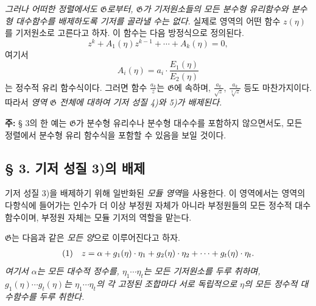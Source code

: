 \emph{그러나 어떠한 정렬에서도 $\mathfrak G$로부터, $\mathfrak G$가 기저원소들의 모든 분수형 유리함수와 분수형 대수함수를 배제하도록 기저를 골라낼 수는 없다.} 실제로 영역의 어떤 함수 $z(\eta)$를 기저원소로 고른다고 하자. 이 함수는 다음 방정식으로 정의된다.
\[
 z^k+A_1(\eta)z^{k-1}+\cdots+A_k(\eta)=0,
\]
여기서
\[
 A_i(\eta)=a_i\cdot\frac{E_1(\eta)}{E_2(\eta)}
\]
는 정수적 유리 함수식이다. 그러면 함수 $\frac{a_k}{z}$는 $\mathfrak G$에 속하며, $\frac{a_k}{\sqrt z}$, $\frac{a_k}{\sqrt[3]z}$ 등도 마찬가지이다. 따라서 \emph{영역 $\mathfrak G$ 전체에 대하여 기저 성질 4)와 5)가 배제된다.}

\textbf{주:} § 3의 한 예는 $\mathfrak G$가 분수형 유리수나 분수형 대수수를 포함하지 않으면서도, 모든 정렬에서 분수형 유리 함수식을 포함할 수 있음을 보일 것이다.

\subsection*{§ 3. 기저 성질 3)의 배제}

기저 성질 3)을 배제하기 위해 일반화된 \emph{모듈 영역}을 사용한다. 이 영역에서는 영역의 다항식에 들어가는 인수가 더 이상 부정원 자체가 아니라 부정원들의 모든 정수적 대수함수이며, 부정원 자체는 모듈 기저의 역할을 맡는다.

$\mathfrak G$는 다음과 같은 \emph{모든 양}으로 이루어진다고 하자.
\[
\begin{array}{@{}l@{\quad}c@{}}
(1)& z=\alpha+g_1(\eta)\cdot\eta_1+g_2(\eta)\cdot\eta_2+\cdots+g_t(\eta)\cdot\eta_t.
\end{array}
\]
\emph{여기서 $\alpha$는 모든 대수적 정수를, $\eta_1\cdots\eta_t$는 모든 기저원소를 두루 취하며, $g_1(\eta)\cdots g_t(\eta)$는 $\eta_1\cdots\eta_t$의 각 고정된 조합마다 서로 독립적으로 $\eta$의 모든 정수적 대수함수를 두루 취한다.}

